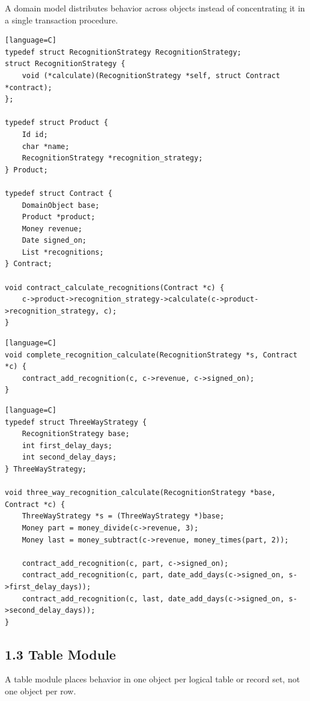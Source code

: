 \documentclass[11pt]{article}
\begin{document}
A domain model distributes behavior across objects instead of
concentrating it in a single transaction procedure.

\begin{verbatim}[language=C]
typedef struct RecognitionStrategy RecognitionStrategy;
struct RecognitionStrategy {
    void (*calculate)(RecognitionStrategy *self, struct Contract *contract);
};

typedef struct Product {
    Id id;
    char *name;
    RecognitionStrategy *recognition_strategy;
} Product;

typedef struct Contract {
    DomainObject base;
    Product *product;
    Money revenue;
    Date signed_on;
    List *recognitions;
} Contract;

void contract_calculate_recognitions(Contract *c) {
    c->product->recognition_strategy->calculate(c->product->recognition_strategy, c);
}
\end{verbatim}

\begin{verbatim}[language=C]
void complete_recognition_calculate(RecognitionStrategy *s, Contract *c) {
    contract_add_recognition(c, c->revenue, c->signed_on);
}
\end{verbatim}

\begin{verbatim}[language=C]
typedef struct ThreeWayStrategy {
    RecognitionStrategy base;
    int first_delay_days;
    int second_delay_days;
} ThreeWayStrategy;

void three_way_recognition_calculate(RecognitionStrategy *base, Contract *c) {
    ThreeWayStrategy *s = (ThreeWayStrategy *)base;
    Money part = money_divide(c->revenue, 3);
    Money last = money_subtract(c->revenue, money_times(part, 2));

    contract_add_recognition(c, part, c->signed_on);
    contract_add_recognition(c, part, date_add_days(c->signed_on, s->first_delay_days));
    contract_add_recognition(c, last, date_add_days(c->signed_on, s->second_delay_days));
}
\end{verbatim}

\subsection{1.3 Table Module}\label{table-module}

A table module places behavior in one object per logical table or record
set, not one object per row.
\end{document}
